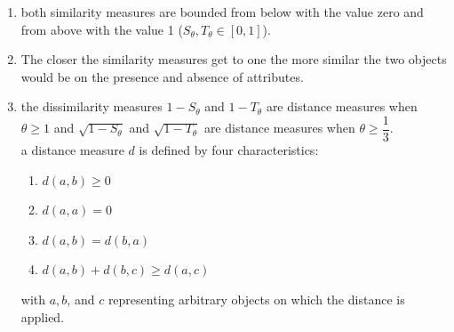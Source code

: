 \begin{enumerate}
    \item both similarity measures are bounded from below with the value zero and from above with the value 1 ($S_\theta, T_\theta \in [0, 1]$).
    \hfill \cite{statistics/book/Statistics-for-Data-Scientists/Maurits-Kaptein}

    \item The closer the similarity measures get to one the more similar the two objects would be on the presence and absence of attributes.
    \hfill \cite{statistics/book/Statistics-for-Data-Scientists/Maurits-Kaptein}


    \item the dissimilarity measures $1 - S_\theta$ and $1 - T_\theta$ are distance measures when $\theta \geq 1$ and $\sqrt{1 - S_\theta}$ and $\sqrt{1 - T_\theta}$ are distance measures when $\theta \geq \dfrac{1}{3}$.
    \hfill \cite{statistics/book/Statistics-for-Data-Scientists/Maurits-Kaptein}
    \\[0.3cm]
    a distance measure $d$ is defined by four characteristics:
    \hfill \cite{statistics/book/Statistics-for-Data-Scientists/Maurits-Kaptein}
    \begin{multicols}{2}
    \begin{enumerate}
        \item $d(a, b) \geq 0$
        \hfill \cite{statistics/book/Statistics-for-Data-Scientists/Maurits-Kaptein}

        \item $d(a, a) = 0$
        \hfill \cite{statistics/book/Statistics-for-Data-Scientists/Maurits-Kaptein}

        \item $d(a, b) = d(b, a)$
        \hfill \cite{statistics/book/Statistics-for-Data-Scientists/Maurits-Kaptein}

        \item $d(a, b) + d(b, c) \geq d(a, c)$
        \hfill \cite{statistics/book/Statistics-for-Data-Scientists/Maurits-Kaptein}
    \end{enumerate}
    \end{multicols}
    with $a, b$, and $c$ representing arbitrary objects on which the distance is applied.
    \hfill \cite{statistics/book/Statistics-for-Data-Scientists/Maurits-Kaptein}


\end{enumerate}
